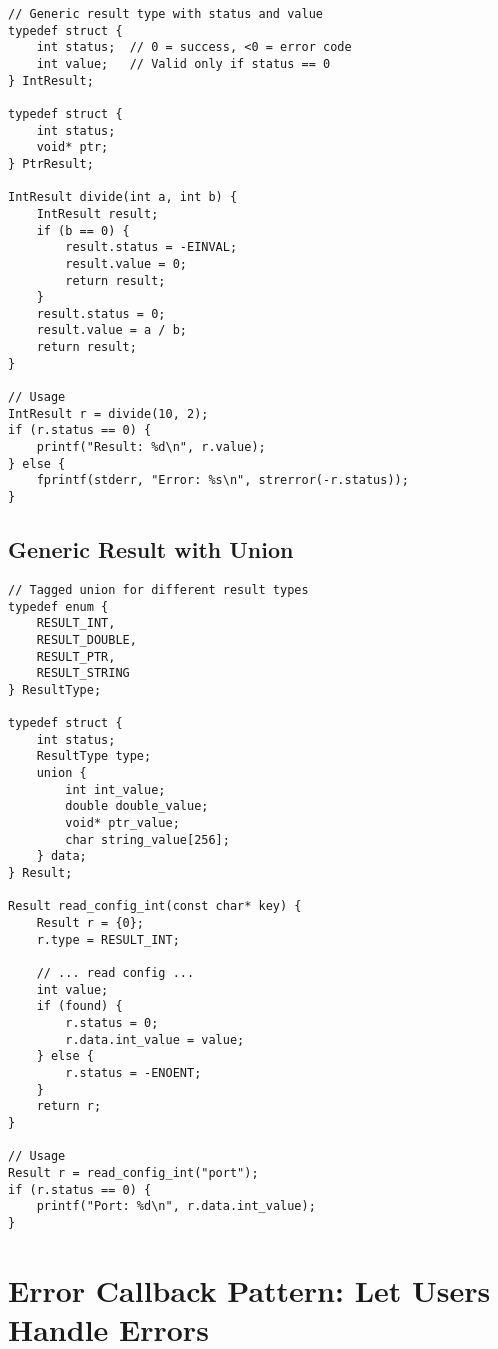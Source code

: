 \begin{lstlisting}
// Generic result type with status and value
typedef struct {
    int status;  // 0 = success, <0 = error code
    int value;   // Valid only if status == 0
} IntResult;

typedef struct {
    int status;
    void* ptr;
} PtrResult;

IntResult divide(int a, int b) {
    IntResult result;
    if (b == 0) {
        result.status = -EINVAL;
        result.value = 0;
        return result;
    }
    result.status = 0;
    result.value = a / b;
    return result;
}

// Usage
IntResult r = divide(10, 2);
if (r.status == 0) {
    printf("Result: %d\n", r.value);
} else {
    fprintf(stderr, "Error: %s\n", strerror(-r.status));
}
\end{lstlisting}

\subsection{Generic Result with Union}

\begin{lstlisting}
// Tagged union for different result types
typedef enum {
    RESULT_INT,
    RESULT_DOUBLE,
    RESULT_PTR,
    RESULT_STRING
} ResultType;

typedef struct {
    int status;
    ResultType type;
    union {
        int int_value;
        double double_value;
        void* ptr_value;
        char string_value[256];
    } data;
} Result;

Result read_config_int(const char* key) {
    Result r = {0};
    r.type = RESULT_INT;

    // ... read config ...
    int value;
    if (found) {
        r.status = 0;
        r.data.int_value = value;
    } else {
        r.status = -ENOENT;
    }
    return r;
}

// Usage
Result r = read_config_int("port");
if (r.status == 0) {
    printf("Port: %d\n", r.data.int_value);
}
\end{lstlisting}

\section{Error Callback Pattern: Let Users Handle Errors}

